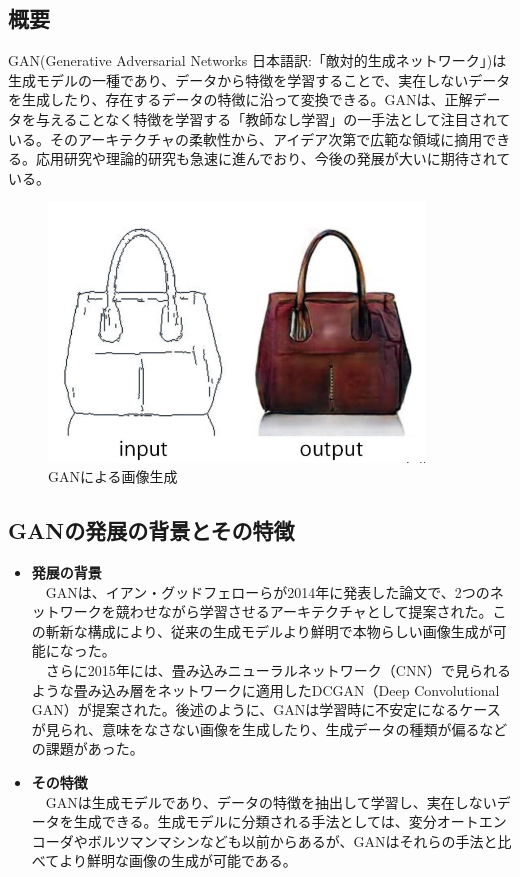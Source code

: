 \documentclass{jarticle}
\begin{document}
\subsection{概要}
GAN(Generative Adversarial Networks 日本語訳:「敵対的生成ネットワーク」)は生成モデルの一種であり、データから特徴を学習することで、実在しないデータを生成したり、存在するデータの特徴に沿って変換できる。GANは、正解データを与えることなく特徴を学習する「教師なし学習」の一手法として注目されている。そのアーキテクチャの柔軟性から、アイデア次第で広範な領域に摘用できる。応用研究や理論的研究も急速に進んでおり、今後の発展が大いに期待されている。
\begin{figure}
\centering
\includegraphics[width=10cm]{pic1.png}
\caption{GANによる画像生成}
\label{GANによる画像生成}
\end{figure}

\subsection{GANの発展の背景とその特徴}
\begin{itemize}
\item \textbf{発展の背景}\\
　GANは、イアン・グッドフェローらが2014年に発表した論文で、2つのネットワークを競わせながら学習させるアーキテクチャとして提案された。この斬新な構成により、従来の生成モデルより鮮明で本物らしい画像生成が可能になった。\\
　さらに2015年には、畳み込みニューラルネットワーク（CNN）で見られるような畳み込み層をネットワークに適用したDCGAN（Deep Convolutional GAN）が提案された。後述のように、GANは学習時に不安定になるケースが見られ、意味をなさない画像を生成したり、生成データの種類が偏るなどの課題があった。
\item \textbf{その特徴}\\
　GANは生成モデルであり、データの特徴を抽出して学習し、実在しないデータを生成できる。生成モデルに分類される手法としては、変分オートエンコーダやボルツマンマシンなども以前からあるが、GANはそれらの手法と比べてより鮮明な画像の生成が可能である。\\
\end{itemize}
\end{document}
